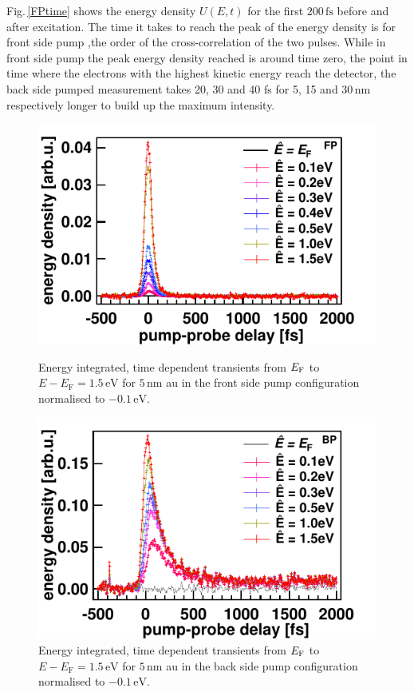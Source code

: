 \documentclass[a4paper,12pt,twoside]{article}
\begin{document}
\noindent
Fig.\,\ref{FPtime} shows the energy density $U(E,t)$ for the first $200\,\mathrm{fs}$ before and after excitation. The time it takes to reach the peak of the energy density is for front side pump ,the order of the cross-correlation of the two pulses. While in front side pump the peak energy density reached is around time zero, the point in time where the electrons with the highest kinetic energy reach the detector, the back side pumped measurement takes 20, 30 and 40 fs for 5, 15 and 30\,nm respectively longer to build up the maximum intensity.
	\begin{figure}[H]
		\begin{minipage}[t]{.45\linewidth}
			\includegraphics[width=\linewidth]{figures/5nmFPNorm.pdf}
			\caption{Energy integrated, time dependent transients from $E_{\rm{F}}$ to $E - E_\mathrm{F} = 1.5\,\mathrm{{eV}}$ for $5\,\mathrm{{nm}}$ \gls{au} in the front side pump configuration normalised to $-0.1\,\mathrm{{eV}}$.}
	    		\label{5nmFPNorm}
		\end{minipage}
	\hspace{.075\linewidth}
		\begin{minipage}[t]{.44\linewidth}
			\includegraphics[width=\linewidth]{figures/5nmBPNorm.pdf}
			\caption{Energy integrated, time dependent transients from $E_{\rm{F}}$ to $E - E_\mathrm{F} = 1.5\,\mathrm{{eV}}$ for $5\,\mathrm{{nm}}$ \gls{au} in the back side pump configuration normalised to $-0.1\,\mathrm{{eV}}$.}
	    		\label{5nmBPNorm}
		\end{minipage}
	\end{figure}
\end{document}

